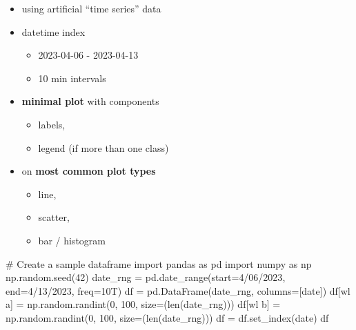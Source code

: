 \documentclass[
  letterpaper,
  DIV=11,
  numbers=noendperiod]{scrartcl}
\newenvironment{Shaded}{\begin{snugshade}}{\end{snugshade}}
\newcommand{\BuiltInTok}[1]{\textcolor[rgb]{0.00,0.23,0.31}{#1}}
\newcommand{\CommentTok}[1]{\textcolor[rgb]{0.37,0.37,0.37}{#1}}
\newcommand{\DecValTok}[1]{\textcolor[rgb]{0.68,0.00,0.00}{#1}}
\newcommand{\ImportTok}[1]{\textcolor[rgb]{0.00,0.46,0.62}{#1}}
\newcommand{\NormalTok}[1]{\textcolor[rgb]{0.00,0.23,0.31}{#1}}
\newcommand{\OperatorTok}[1]{\textcolor[rgb]{0.37,0.37,0.37}{#1}}
\newcommand{\StringTok}[1]{\textcolor[rgb]{0.13,0.47,0.30}{#1}}
\providecommand{\tightlist}{%
  \setlength{\itemsep}{0pt}\setlength{\parskip}{0pt}}\usepackage{longtable,booktabs,array}
\begin{document}
\begin{itemize}
\tightlist
\item
  using artificial ``time series'' data
\item
  datetime index

  \begin{itemize}
  \tightlist
  \item
    2023-04-06 - 2023-04-13
  \item
    10 min intervals
  \end{itemize}
\item
  \textbf{minimal plot} with components

  \begin{itemize}
  \tightlist
  \item
    labels,
  \item
    legend (if more than one class)
  \end{itemize}
\item
  on \textbf{most common plot types}

  \begin{itemize}
  \tightlist
  \item
    line,
  \item
    scatter,
  \item
    bar / histogram
  \end{itemize}
\end{itemize}

\begin{Shaded}
\begin{Highlighting}[]
\CommentTok{\# Create a sample dataframe}
\ImportTok{import}\NormalTok{ pandas }\ImportTok{as}\NormalTok{ pd}
\ImportTok{import}\NormalTok{ numpy }\ImportTok{as}\NormalTok{ np}
\NormalTok{np.random.seed(}\DecValTok{42}\NormalTok{)}
\NormalTok{date\_rng }\OperatorTok{=}\NormalTok{ pd.date\_range(start}\OperatorTok{=}\StringTok{\textquotesingle{}4/06/2023\textquotesingle{}}\NormalTok{, end}\OperatorTok{=}\StringTok{\textquotesingle{}4/13/2023\textquotesingle{}}\NormalTok{, freq}\OperatorTok{=}\StringTok{\textquotesingle{}10T\textquotesingle{}}\NormalTok{)}
\NormalTok{df }\OperatorTok{=}\NormalTok{ pd.DataFrame(date\_rng, columns}\OperatorTok{=}\NormalTok{[}\StringTok{\textquotesingle{}date\textquotesingle{}}\NormalTok{])}
\NormalTok{df[}\StringTok{\textquotesingle{}wl a\textquotesingle{}}\NormalTok{] }\OperatorTok{=}\NormalTok{ np.random.randint(}\DecValTok{0}\NormalTok{, }\DecValTok{100}\NormalTok{, size}\OperatorTok{=}\NormalTok{(}\BuiltInTok{len}\NormalTok{(date\_rng)))}
\NormalTok{df[}\StringTok{\textquotesingle{}wl b\textquotesingle{}}\NormalTok{] }\OperatorTok{=}\NormalTok{ np.random.randint(}\DecValTok{0}\NormalTok{, }\DecValTok{100}\NormalTok{, size}\OperatorTok{=}\NormalTok{(}\BuiltInTok{len}\NormalTok{(date\_rng)))}
\NormalTok{df }\OperatorTok{=}\NormalTok{ df.set\_index(}\StringTok{\textquotesingle{}date\textquotesingle{}}\NormalTok{)}
\NormalTok{df}
\end{Highlighting}
\end{Shaded}
\end{document}
